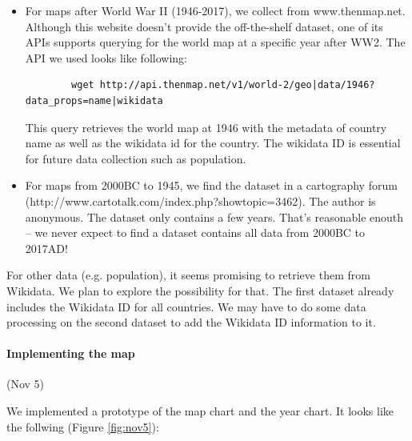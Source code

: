 \documentclass[12pt, fullpage,letterpaper]{article}
\begin{document}
\begin{itemize}
    \item For maps after World War II (1946-2017), we collect from www.thenmap.net.
        Although this website doesn't provide the off-the-shelf dataset, one of its
        APIs supports querying for the world map at a specific year after WW2. The API
        we used looks like following:

        \begin{verbatim}
        wget http://api.thenmap.net/v1/world-2/geo|data/1946?data_props=name|wikidata
        \end{verbatim}

        This query retrieves the world map at 1946 with the metadata of country name as well as
        the wikidata id for the country. The wikidata ID is essential for future data collection
        such as population.

    \item For maps from 2000BC to 1945, we find the dataset in a cartography forum (http://www.cartotalk.com/index.php?showtopic=3462).
        The author is anonymous.
        The dataset only contains a few years. That's reasonable enouth -- we never expect to
        find a dataset contains all data from 2000BC to 2017AD!

\end{itemize}

For other data (e.g. population), it seems promising to retrieve them from Wikidata.
We plan to explore the possibility for that.
The first dataset already includes the Wikidata ID for all countries.
We may have to do some data processing on the second dataset to add the Wikidata ID information to it.

\newpage
\paragraph{Implementing the map} (Nov 5)

We implemented a prototype of the map chart and the year chart.
It looks like the follwing (Figure \ref{fig:nov5}):
\end{document}
